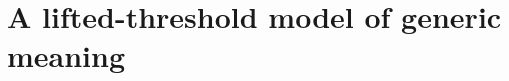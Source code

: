 \documentclass[10pt,letterpaper]{article}
\newcommand{\red}[1]{\textcolor{Red}{#1}}
\begin{document}
%







\section{A lifted-threshold model of generic meaning}
\end{document}
